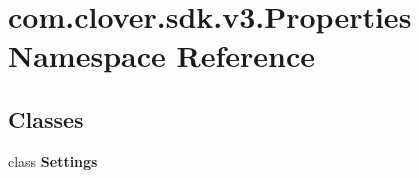 \hypertarget{namespacecom_1_1clover_1_1sdk_1_1v3_1_1_properties}{}\section{com.\+clover.\+sdk.\+v3.\+Properties Namespace Reference}
\label{namespacecom_1_1clover_1_1sdk_1_1v3_1_1_properties}
\subsection*{Classes}
\begin{DoxyCompactItemize}
\item 
class {\bfseries Settings}
\end{DoxyCompactItemize}
